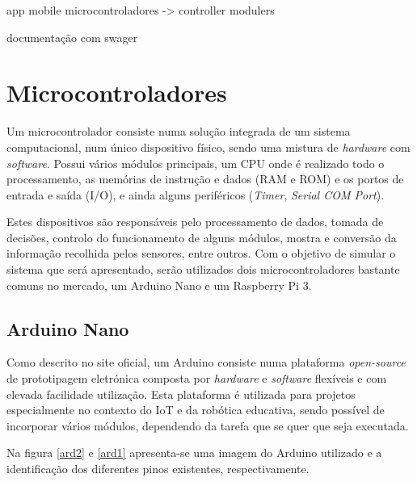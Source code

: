 app mobile
microcontroladores -> controller modulers 


documentação com swager 





\newpage
\section{Microcontroladores}


Um microcontrolador consiste numa solução integrada de um sistema computacional, num único dispositivo físico, sendo uma mistura de \textit{hardware} com \textit{software}. Possui vários módulos principais, um \ac{CPU} onde é realizado todo o processamento, as memórias de instrução e dados (\ac{RAM} e \ac{ROM}) e os portos de entrada e saída (\ac{I/O}), e ainda alguns periféricos (\textit{Timer}, \textit{Serial COM Port}). 

Estes dispositivos são responsáveis pelo processamento de dados, tomada de decisões, controlo do funcionamento de alguns módulos, mostra e conversão da informação recolhida pelos sensores, entre outros. Com o objetivo de simular o sistema que será apresentado, serão utilizados dois microcontroladores bastante comuns no mercado, um Arduino Nano e um Raspberry Pi 3.  


\subsection{Arduino Nano}


Como descrito no site oficial, um Arduino consiste numa plataforma \textit{open-source} de prototipagem eletrónica composta por \textit{hardware} e \textit{software} flexíveis e com elevada facilidade utilização. Esta plataforma é utilizada para projetos especialmente no contexto do \ac{IoT} e da robótica educativa, sendo possível de incorporar vários módulos, dependendo da tarefa que se quer que seja executada\cite{Banzi2012}. 

Na figura \ref{ard2} e \ref{ard1} apresenta-se uma imagem do Arduino utilizado e a identificação dos diferentes pinos existentes, respectivamente. 


